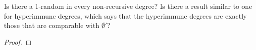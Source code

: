 \begin{question}
  Is there a 1-random in every non-recursive degree? Is there a result
  similar to one for hyperimmune degrees, which says that the
  hyperimmune degrees are exactly those that are comparable with
  $\emptyset'$?
\end{question}
\begin{proof}
\end{proof}
